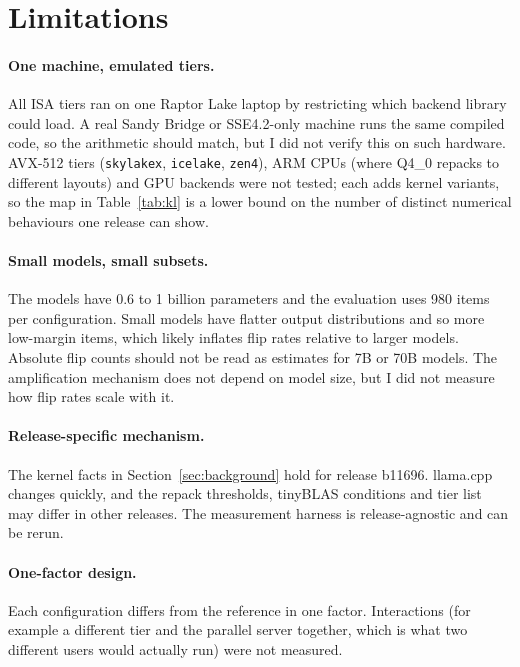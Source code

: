 \section{Limitations}
\label{sec:limits}

\paragraph{One machine, emulated tiers.}
All ISA tiers ran on one Raptor Lake laptop by restricting which backend library could load.
A real Sandy Bridge or SSE4.2-only machine runs the same compiled code, so the arithmetic should
match, but I did not verify this on such hardware. AVX-512 tiers (\texttt{skylakex},
\texttt{icelake}, \texttt{zen4}), ARM CPUs (where Q4\_0 repacks to different layouts) and GPU
backends were not tested; each adds kernel variants, so the map in
Table~\ref{tab:kl} is a lower bound on the number of distinct numerical behaviours one
release can show.

\paragraph{Small models, small subsets.}
The models have 0.6 to 1 billion parameters and the evaluation uses 980 items per configuration.
Small models have flatter output distributions and so more low-margin items, which likely
inflates flip rates relative to larger models. Absolute flip counts should not be read as
estimates for 7B or 70B models. The amplification mechanism does not depend on model size, but
I did not measure how flip rates scale with it.

\paragraph{Release-specific mechanism.}
The kernel facts in Section~\ref{sec:background} hold for release b11696. llama.cpp changes
quickly, and the repack thresholds, tinyBLAS conditions and tier list may differ in other
releases. The measurement harness is release-agnostic and can be rerun.

\paragraph{One-factor design.}
Each configuration differs from the reference in one factor. Interactions (for example a
different tier and the parallel server together, which is what two different users would
actually run) were not measured.

